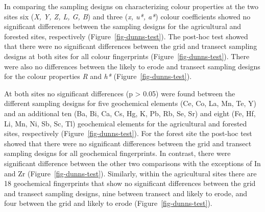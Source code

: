 \documentclass[
  number]{elsarticle}
\begin{document}
In comparing the sampling designs on characterizing colour properties at
the two sites six (\emph{X, Y, Z, L, G, B}) and three (\emph{x, u*, a*})
colour coefficients showed no significant differences between the
sampling designs for the agricultural and forested sites, respectively
(Figure~\ref{fig-dunns-test}). The post-hoc test showed that there were
no significant differences between the grid and transect sampling
designs at both sites for all colour fingerprints
(Figure~\ref{fig-dunns-test}). There were also no differences between
the likely to erode and transect sampling designs for the colour
properties \emph{R} and \emph{h*} (Figure~\ref{fig-dunns-test}).

At both sites no significant differences (p \textgreater{} 0.05) were
found between the different sampling designs for five geochemical
elements (Ce, Co, La, Mn, Te, Y) and an additional ten (Ba, Bi, Ca, Cs,
Hg, K, Pb, Rb, Se, Sr) and eight (Fe, Hf, Li, Mn, Ni, Sb, Sc, Tl)
geochemical elements for the agricultural and forested sites,
respectively (Figure~\ref{fig-dunns-test}). For the forest site the
post-hoc test showed that there were no significant differences between
the grid and transect sampling designs for all geochemical fingerprints.
In contrast, there were significant difference between the other two
comparisons with the exceptions of In and Zr
(Figure~\ref{fig-dunns-test}). Similarly, within the agricultural sites
there are 18 geochemical fingerprints that show no significant
differences between the grid and transect sampling designs, nine between
transect and likely to erode, and four between the grid and likely to
erode (Figure~\ref{fig-dunns-test}).
\end{document}
